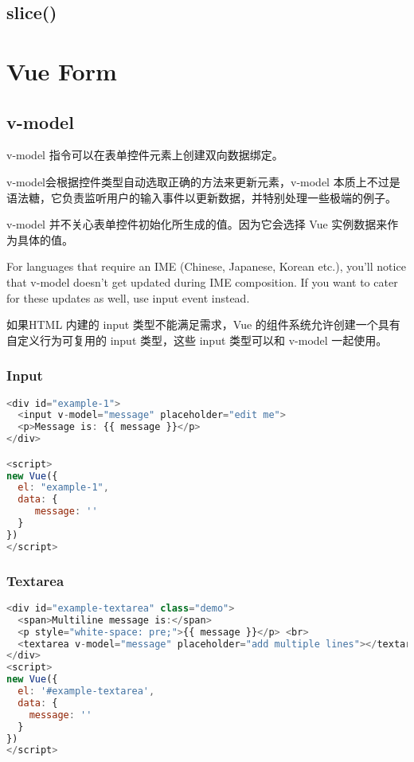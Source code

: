 \section{slice()}



\chapter{Vue Form}




\section{v-model}


v-model 指令可以在表单控件元素上创建双向数据绑定。

v-model会根据控件类型自动选取正确的方法来更新元素，v-model 本质上不过是语法糖，它负责监听用户的输入事件以更新数据，并特别处理一些极端的例子。


v-model 并不关心表单控件初始化所生成的值。因为它会选择 Vue 实例数据来作为具体的值。

For languages that require an IME (Chinese, Japanese, Korean etc.), you’ll notice that v-model doesn’t get updated during IME composition. If you want to cater for these updates as well, use input event instead.

如果HTML 内建的 input 类型不能满足需求，Vue 的组件系统允许创建一个具有自定义行为可复用的 input 类型，这些 input 类型可以和 v-model 一起使用。

\subsection{Input}


\begin{lstlisting}[language=JavaScript]
<div id="example-1">
  <input v-model="message" placeholder="edit me">
  <p>Message is: {{ message }}</p>
</div>

<script>
new Vue({
  el: "example-1",
  data: {
     message: ''
  }
})
</script>
\end{lstlisting}

\subsection{Textarea}


\begin{lstlisting}[language=JavaScript]
<div id="example-textarea" class="demo">
  <span>Multiline message is:</span> 
  <p style="white-space: pre;">{{ message }}</p> <br> 
  <textarea v-model="message" placeholder="add multiple lines"></textarea>
</div>
<script>
new Vue({
  el: '#example-textarea',
  data: {
    message: ''
  }
})
</script>
\end{lstlisting}

